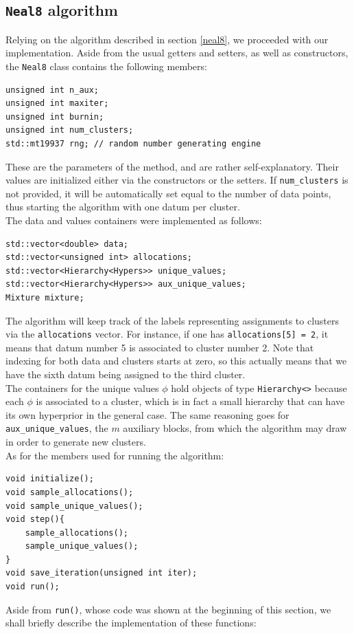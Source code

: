\subsection{\texttt{Neal8} algorithm}
Relying on the algorithm described in section \ref{neal8}, we proceeded with our implementation.
Aside from the usual getters and setters, as well as constructors, the \verb|Neal8| class contains the following members:
\begin{verbatim}
unsigned int n_aux;
unsigned int maxiter;
unsigned int burnin;
unsigned int num_clusters;
std::mt19937 rng; // random number generating engine
\end{verbatim}
These are the parameters of the method, and are rather self-explanatory.
Their values are initialized either via the constructors or the setters.
If \verb|num_clusters| is not provided, it will be automatically set equal to the number of data points, thus starting the algorithm with one datum per cluster. \\
The data and values containers were implemented as follows:
\begin{verbatim}
std::vector<double> data;
std::vector<unsigned int> allocations;
std::vector<Hierarchy<Hypers>> unique_values;
std::vector<Hierarchy<Hypers>> aux_unique_values;
Mixture mixture;
\end{verbatim}
The algorithm will keep track of the labels representing assignments to clusters via the \verb|allocations| vector.
For instance, if one has \verb|allocations[5] = 2|, it means that datum number 5 is associated to cluster number 2.
Note that indexing for both data and clusters starts at zero, so this actually means that we have the sixth datum being assigned to the third cluster. \\
The containers for the unique values $\phi$ hold objects of type \verb|Hierarchy<>| because each $\phi$ is associated to a cluster, which is in fact a small hierarchy that can have its own hyperprior in the general case.
The same reasoning goes for \verb|aux_unique_values|, the $m$ auxiliary blocks, from which the algorithm may draw in order to generate new clusters. \\
As for the members used for running the algorithm:
\begin{verbatim}
void initialize();
void sample_allocations();
void sample_unique_values();
void step(){
    sample_allocations();
    sample_unique_values();
}
void save_iteration(unsigned int iter);
void run();
\end{verbatim}
Aside from \verb|run()|, whose code was shown at the beginning of this section, we shall briefly describe the implementation of these functions:
